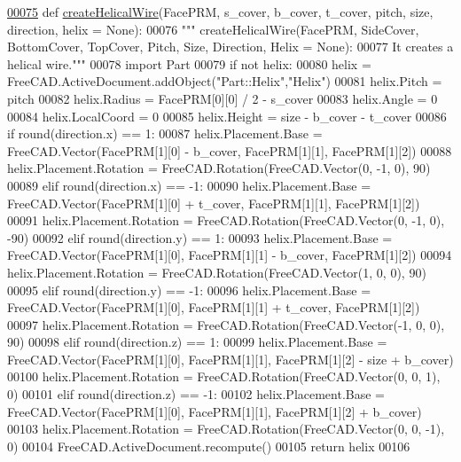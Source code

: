 \begin{DoxyCode}
\hypertarget{namespaceHelicalRebar.tex_l00075}{}\hyperlink{namespaceHelicalRebar_a1a2b3ce39b904ab0c3892ed0965d2844}{00075} \textcolor{keyword}{def }\hyperlink{namespaceHelicalRebar_a1a2b3ce39b904ab0c3892ed0965d2844}{createHelicalWire}(FacePRM, s\_cover, b\_cover, t\_cover, pitch, size, direction, helix = 
      None):
00076     \textcolor{stringliteral}{""" createHelicalWire(FacePRM, SideCover, BottomCover, TopCover, Pitch, Size, Direction, Helix = None):}
00077 \textcolor{stringliteral}{    It creates a helical wire."""}
00078     \textcolor{keyword}{import} Part
00079     \textcolor{keywordflow}{if} \textcolor{keywordflow}{not} helix:
00080         helix = FreeCAD.ActiveDocument.addObject(\textcolor{stringliteral}{"Part::Helix"},\textcolor{stringliteral}{"Helix"})
00081     helix.Pitch = pitch
00082     helix.Radius = FacePRM[0][0] / 2 - s\_cover
00083     helix.Angle = 0
00084     helix.LocalCoord = 0
00085     helix.Height = size - b\_cover - t\_cover
00086     \textcolor{keywordflow}{if} round(direction.x) == 1:
00087         helix.Placement.Base = FreeCAD.Vector(FacePRM[1][0] - b\_cover, FacePRM[1][1], FacePRM[1][2])
00088         helix.Placement.Rotation = FreeCAD.Rotation(FreeCAD.Vector(0, -1, 0), 90)
00089     \textcolor{keywordflow}{elif} round(direction.x) == -1:
00090         helix.Placement.Base = FreeCAD.Vector(FacePRM[1][0] + t\_cover, FacePRM[1][1], FacePRM[1][2])
00091         helix.Placement.Rotation = FreeCAD.Rotation(FreeCAD.Vector(0, -1, 0), -90)
00092     \textcolor{keywordflow}{elif} round(direction.y) == 1:
00093         helix.Placement.Base = FreeCAD.Vector(FacePRM[1][0], FacePRM[1][1] - b\_cover, FacePRM[1][2])
00094         helix.Placement.Rotation = FreeCAD.Rotation(FreeCAD.Vector(1, 0, 0), 90)
00095     \textcolor{keywordflow}{elif} round(direction.y) == -1:
00096         helix.Placement.Base = FreeCAD.Vector(FacePRM[1][0], FacePRM[1][1] + t\_cover, FacePRM[1][2])
00097         helix.Placement.Rotation = FreeCAD.Rotation(FreeCAD.Vector(-1, 0, 0), 90)
00098     \textcolor{keywordflow}{elif} round(direction.z) == 1:
00099         helix.Placement.Base = FreeCAD.Vector(FacePRM[1][0], FacePRM[1][1], FacePRM[1][2] - size + b\_cover)
00100         helix.Placement.Rotation = FreeCAD.Rotation(FreeCAD.Vector(0, 0, 1), 0)
00101     \textcolor{keywordflow}{elif} round(direction.z) == -1:
00102         helix.Placement.Base = FreeCAD.Vector(FacePRM[1][0], FacePRM[1][1], FacePRM[1][2] + b\_cover)
00103         helix.Placement.Rotation = FreeCAD.Rotation(FreeCAD.Vector(0, 0, -1), 0)
00104     FreeCAD.ActiveDocument.recompute()
00105     \textcolor{keywordflow}{return} helix
00106 
\end{DoxyCode}



